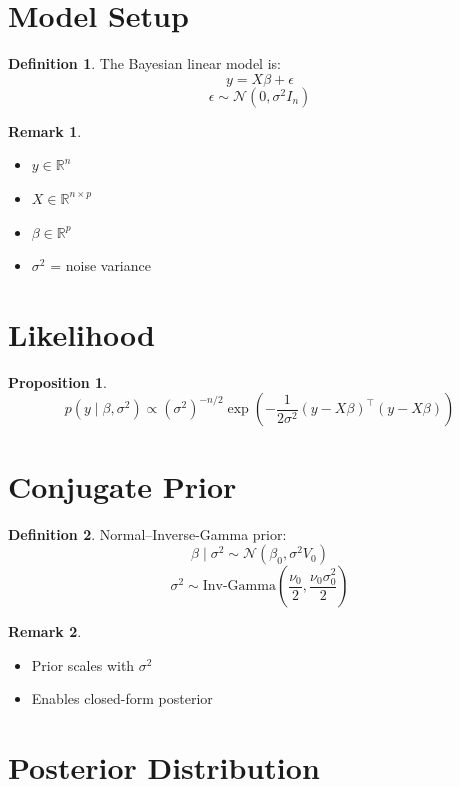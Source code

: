 \documentclass[12pt,oneside]{book}
\numberwithin{equation}{section}
\theoremstyle{definition}
\newtheorem{definition}{Definition}[section]
\newtheorem{remark}{Remark}[section]
\theoremstyle{plain}
\newtheorem{proposition}{Proposition}[section]
\theoremstyle{remark}
\newcommand{\Normal}{\mathcal{N}}
\begin{document}
\section{Model Setup}

\begin{definition}
The Bayesian linear model is:
$$
y = X\beta + \epsilon
$$
$$
\epsilon \sim \Normal(0, \sigma^2 I_n)
$$
\end{definition}

\begin{remark}
\begin{itemize}
\item $y \in \mathbb{R}^n$
\item $X \in \mathbb{R}^{n \times p}$
\item $\beta \in \mathbb{R}^p$
\item $\sigma^2$ = noise variance
\end{itemize}
\end{remark}

\section{Likelihood}

\begin{proposition}
$$
p(y \mid \beta, \sigma^2)
\propto
(\sigma^2)^{-n/2}
\exp\left(
-\frac{1}{2\sigma^2}(y - X\beta)^\top (y - X\beta)
\right)
$$
\end{proposition}

\section{Conjugate Prior}

\begin{definition}
Normal–Inverse-Gamma prior:
$$
\beta \mid \sigma^2 \sim \Normal(\beta_0, \sigma^2 V_0)
$$
$$
\sigma^2 \sim \text{Inv-Gamma}\left(\frac{\nu_0}{2}, \frac{\nu_0 \sigma_0^2}{2}\right)
$$
\end{definition}

\begin{remark}
\begin{itemize}
\item Prior scales with $\sigma^2$
\item Enables closed-form posterior
\end{itemize}
\end{remark}

\section{Posterior Distribution}
\end{document}
